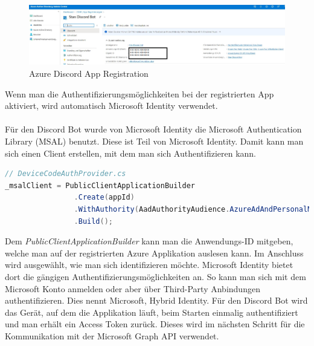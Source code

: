 \documentclass[a4paper, table]{article}
\begin{document}
\begin{figure}[h]
    \centering
    \includegraphics[width=1\textwidth]{img/azure_discord_app_blacked.png}
    \caption{Azure Discord App Registration}
    \label{fig:azure-discord-app-registration}
\end{figure}

Wenn man die Authentifizierungsmöglichkeiten bei der registrierten App aktiviert, wird automatisch Microsoft Identity verwendet.\\\\
Für den Discord Bot wurde von Microsoft Identity die Microsoft Authentication Library (MSAL) benutzt. \autocite{dickson-mwendia_initialize_nodate}
Diese ist Teil von Microsoft Identity.
Damit kann man sich einen Client erstellen, mit dem man sich Authentifizieren kann.

\begin{lstlisting}[language=csharp]
// DeviceCodeAuthProvider.cs
_msalClient = PublicClientApplicationBuilder
                .Create(appId)
                .WithAuthority(AadAuthorityAudience.AzureAdAndPersonalMicrosoftAccount, true)
                .Build();
\end{lstlisting}

Dem \textit{PublicClientApplicationBuilder} kann man die Anwendungs-ID mitgeben, welche man auf der registrierten Azure Applikation auslesen kann.
Im Anschluss wird ausgewählt, wie man sich identifizieren möchte.
Microsoft Identity bietet dort die gängigen Authentifizierungsmöglichkeiten an.
So kann man sich mit dem Microsoft Konto anmelden oder aber über Third-Party Anbindungen authentifizieren.
Dies nennt Microsoft, Hybrid Identity. \autocite{billmath_what_nodate}
Für den Discord Bot wird das Gerät, auf dem die Applikation läuft, beim Starten einmalig authentifiziert und man erhält ein Access Token zurück.
Dieses wird im nächsten Schritt für die Kommunikation mit der Microsoft Graph API verwendet.
\end{document}
